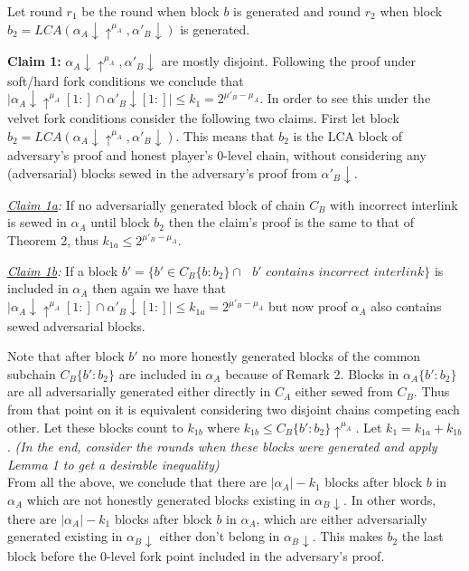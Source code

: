 \documentclass[9pt,a4paper]{article}
\begin{document}
Let round $r_1$ be the round when block $b$ is generated and round $r_2$ when block $b_2 = LCA(\alpha_A \downarrow \uparrow^{\mu_A}, \alpha'_B\downarrow)$ is generated.

\textbf{Claim 1:} $\alpha_A \downarrow \uparrow^{\mu_A}, \alpha'_B\downarrow$ are mostly disjoint. Following the proof under soft/hard fork conditions we conclude that $\vert \alpha_A\downarrow\uparrow^{\mu_A}[1:] \cap \alpha'_B\downarrow[1:] \vert \leq k_{1} = 2^{\mu'_B - \mu_A}$. In order to see this under the velvet fork conditions consider the following two claims. First let block $b_2 = LCA(\alpha_A \downarrow \uparrow^{\mu_A}, \alpha'_B\downarrow)$. This means that $b_2$ is the LCA block of adversary's proof and honest player's 0-level chain, without considering any (adversarial) blocks sewed in the adversary's proof from $\alpha'_B \downarrow$.

\textit{\underline{Claim 1a}:} If no adversarially generated block of chain $C_B$ with incorrect interlink is sewed in $\alpha_A$ until block $b_2$ then the claim's proof is the same to that of Theorem 2, thus $k_{1a} \leq 2^{\mu'_B - \mu_A}$.



\textit{\underline{Claim 1b}:}  If a block $b' = \{b' \in C_B\{b:b_2\} \cap \textit{ } b' \textit{ contains incorrect interlink} \}$ is included in $\alpha_A$ then again we have that $\vert \alpha_A\downarrow\uparrow^{\mu_A}[1:] \cap \alpha'_B\downarrow[1:] \vert \leq k_{1a} = 2^{\mu'_B - \mu_A}$ but now proof $\alpha_A$ also contains sewed adversarial blocks. 
	
Note that after block $b'$ no more honestly generated blocks of the common subchain $C_B\{b':b_2\}$ are included in $\alpha_A$ because of Remark 2. Blocks in $\alpha_A\{b':b_2\}$ are all adversarially generated either directly in $C_A$ either sewed from $C_B$. Thus from that point on it is equivalent considering two disjoint chains competing each other. Let these blocks count to $k_{1b}$  where $k_{1b} \leq C_B\{b':b_2\}\uparrow^{\mu_A}$. Let $k_1 = k_{1a} + k_{1b}$. \textit{(In the end, consider the rounds when these blocks were generated and apply Lemma 1 to get a desirable inequality)}\\

From all the above, we conclude that there are $\vert \alpha_A \vert - k_1$ blocks after block $b$ in $\alpha_A$ which are not honestly generated blocks existing in $\alpha_B\downarrow$. In other words, there are $\vert \alpha_A \vert - k_1$ blocks after block $b$ in $\alpha_A$, which are either adversarially generated existing in $\alpha_B\downarrow$ either don't belong in $\alpha_B\downarrow$. This makes $b_2$ the last block before the 0-level fork point included in the adversary's proof.\\
\end{document}
